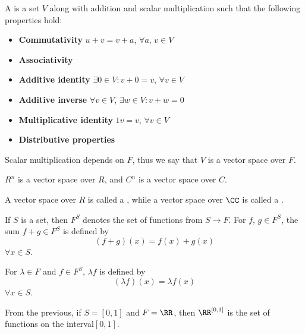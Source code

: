 \begin{definition}
  A  is a set $V$ along with addition and scalar multiplication such that the following properties hold:
  \begin{itemize}
  \item \textbf{Commutativity} \; $u + v = v + a$, $\forall a$, $v \in V$
  \item \textbf{Associativity} 
  \item \textbf{Additive identity} \; $\exists 0 \in V : v + 0 = v$, $\forall v \in V$
  \item \textbf{Additive inverse} \; $\forall v \in V$, $\exists w \in V : v + w = 0$
  \item \textbf{Multiplicative identity} \; $1v = v$, $\forall v \in V$
  \item \textbf{Distributive properties} 
  \end{itemize}
\end{definition}

Scalar multiplication depends on $F$, thus we say that $V$ is a vector space over $F$. 
\begin{example}
  $R^{n}$ is a vector space over $R$, and $C^{n}$ is a vector space over $C$.
\end{example}

\begin{definition}
  A vector space over $R$ is called a , while a vector space over $\CC$ is called a .
\end{definition}

\begin{definition}[$F^S$]
  If $S$ is a set, then $F^{S}$ denotes the set of functions from $S \to F$.
  For $f$, $g \in F^{S}$, the sum $f + g \in F^{S}$ is defined by
  \begin{equation*}
    (f + g)(x) = f(x) + g(x)
  \end{equation*}
  $\forall x \in S$.

  For $\lambda \in F$ and $f \in F^{S}$, $\lambda f$ is defined by 
  \begin{equation*}
    (\lambda f)(x) = \lambda f(x)
  \end{equation*}
  $\forall x \in S$.
\end{definition}

From the previous, if $S = \left[0, 1\right]$ and $F = \RR$, then $\RR^{\left[0, 1\right]}$ is the set of functions on the interval$[0, 1]$.

